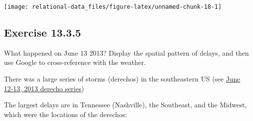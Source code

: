 \documentclass[]{book}
\newenvironment{Shaded}{\begin{snugshade}}{\end{snugshade}}
\newcommand{\DataTypeTok}[1]{\textcolor[rgb]{0.13,0.29,0.53}{#1}}
\newcommand{\KeywordTok}[1]{\textcolor[rgb]{0.13,0.29,0.53}{\textbf{#1}}}
\newcommand{\NormalTok}[1]{#1}
\newcommand{\OperatorTok}[1]{\textcolor[rgb]{0.81,0.36,0.00}{\textbf{#1}}}
\newcommand{\OtherTok}[1]{\textcolor[rgb]{0.56,0.35,0.01}{#1}}
\newcommand{\StringTok}[1]{\textcolor[rgb]{0.31,0.60,0.02}{#1}}
\theoremstyle{plain}
\theoremstyle{remark}
\theoremstyle{definition}
\theoremstyle{definition}
\theoremstyle{definition}
\theoremstyle{remark}
\begin{document}
\begin{Shaded}
\end{Shaded}

\begin{center}\texttt{[image: relational-data\_files/figure-latex/unnamed-chunk-18-1]} \end{center}

\hypertarget{exercise-13.3.5}{%
\subsection*{\texorpdfstring{Exercise
{13.3.5}}{Exercise 13.3.5}}\label{exercise-13.3.5}}

What happened on June 13 2013? Display the spatial pattern of delays,
and then use Google to cross-reference with the weather.

There was a large series of storms (derechos) in the southeastern US
(see
\href{https://en.wikipedia.org/wiki/June_12\%E2\%80\%9313,_2013_derecho_series}{June
12-13, 2013 derecho series})

The largest delays are in Tennessee (Nashville), the Southeast, and the
Midwest, which were the locations of the derechos:
\end{document}
